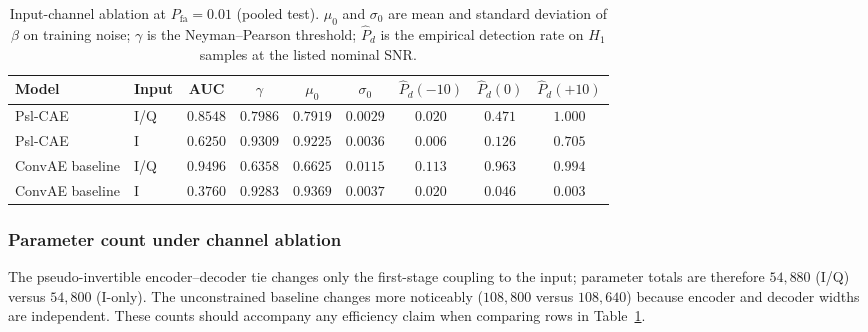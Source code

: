 \begin{table}[!t]
  \centering
  \footnotesize
  \caption{Input-channel ablation at $P_{\mathrm{fa}}\!=\!0.01$ (pooled test). $\mu_0$ and $\sigma_0$ are mean and standard deviation of $\beta$ on training noise; $\gamma$ is the Neyman--Pearson threshold; $\hat{P}_d$ is the empirical detection rate on $H_1$ samples at the listed nominal SNR.}
  \label{tab:channel_ablation}
  \begin{tabular}{@{}llccccccc@{}}
    \toprule
    \textbf{Model} & \textbf{Input} & \textbf{AUC} & \textbf{$\gamma$} & \textbf{$\mu_0$} & \textbf{$\sigma_0$} &
    \textbf{$\hat{P}_d(-10)$} & \textbf{$\hat{P}_d(0)$} & \textbf{$\hat{P}_d(+10)$} \\
    \midrule
    Psl-CAE        & I/Q & $0.8548$ & $0.7986$ & $0.7919$ & $0.0029$ & $0.020$ & $0.471$ & $1.000$ \\
    Psl-CAE        & I   & $0.6250$ & $0.9309$ & $0.9225$ & $0.0036$ & $0.006$ & $0.126$ & $0.705$ \\
    ConvAE baseline& I/Q & $0.9496$ & $0.6358$ & $0.6625$ & $0.0115$ & $0.113$ & $0.963$ & $0.994$ \\
    ConvAE baseline& I   & $0.3760$ & $0.9283$ & $0.9369$ & $0.0037$ & $0.020$ & $0.046$ & $0.003$ \\
    \bottomrule
  \end{tabular}
\end{table}

\subsubsection{Parameter count under channel ablation}
The pseudo-invertible encoder--decoder tie changes only the first-stage coupling to the input; parameter totals are therefore $54{,}880$ (I/Q) versus $54{,}800$ (I-only). The unconstrained baseline changes more noticeably ($108{,}800$ versus $108{,}640$) because encoder and decoder widths are independent. These counts should accompany any efficiency claim when comparing rows in Table~\ref{tab:channel_ablation}.

